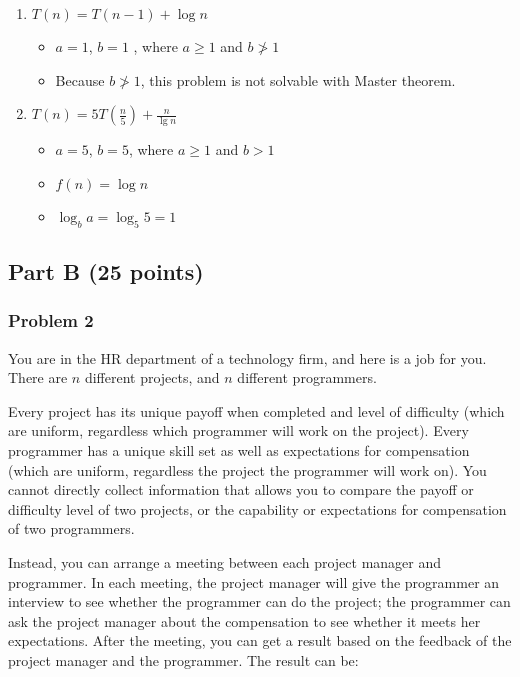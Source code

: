 \documentclass[11pt]{article}
\begin{document}
\begin{enumerate}[label=\Alph*.]
\begin{itemize}
	\end{itemize}
	
	\item $T(n) = T(n-1) + \log n$
	
	\begin{itemize}
	
		\item $a = 1$, $b = 1$ , where $a \geq 1$ and $b \not> 1$
		\item Because $b \not> 1$, this problem is not solvable with Master theorem.
	
	\end{itemize}
	
	\item $T(n) = 5T(\frac{n}{5}) + \frac{n}{\lg n}$
	
	\begin{itemize}
	
		\item $a = 5$, $b = 5$, where $a \geq 1$ and $b > 1$
		\item $f(n) = \log n$
		\item $\log_b a = \log_5 5 = 1$
	
	\end{itemize}
	
\end{enumerate}

\subsection*{Part B (25 points)}

\subsubsection*{Problem 2} 

You are in the HR department of a
technology firm, and here is a job for you.  There are $n$ different
projects, and $n$ different programmers.

Every project has its unique payoff when completed and level of
difficulty (which are uniform, regardless which programmer will work
on the project).  Every programmer has a unique skill set as well as
expectations for compensation (which are uniform, regardless the
project the programmer will work on). You cannot directly collect
information that allows you to compare the payoff or difficulty level
of two projects, or the capability or expectations for compensation of
two programmers.

Instead, you can arrange a meeting between each project manager and
programmer.  In each meeting, the project manager will give the
programmer an interview to see whether the programmer can do the
project; the programmer can ask the project manager about the
compensation to see whether it meets her expectations.  After the
meeting, you can get a result based on the feedback of the project
manager and the programmer.  The result can be:
\end{document}
